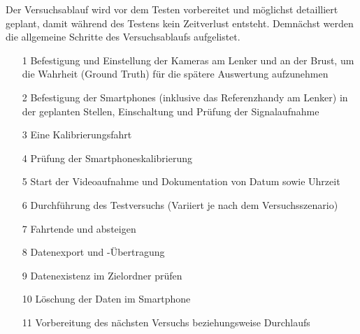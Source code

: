 Der Versuchsablauf wird vor dem Testen vorbereitet und möglichst detailliert geplant, damit während des Testens kein Zeitverlust entsteht.
Demnächst werden die allgemeine Schritte des Versuchsablaufs aufgelistet.

\begin{itemize}
	\item[1] Befestigung und Einstellung der Kameras am Lenker und an der Brust, um die Wahrheit (Ground Truth) für die spätere Auswertung aufzunehmen
	\item[2] Befestigung der Smartphones (inklusive das Referenzhandy am Lenker) in der geplanten Stellen, Einschaltung und Prüfung der Signalaufnahme
	\item[3] Eine Kalibrierungsfahrt
	\item[4] Prüfung der Smartphoneskalibrierung
	\item[5] Start der Videoaufnahme und Dokumentation von Datum sowie Uhrzeit
	\item[6] Durchführung des Testversuchs (Variiert je nach dem Versuchsszenario)
	\item[7] Fahrtende und absteigen
	\item[8] Datenexport und -Übertragung
	\item[9] Datenexistenz im Zielordner prüfen
	\item[10] Löschung der Daten im Smartphone
	\item[11] Vorbereitung des nächsten Versuchs beziehungsweise Durchlaufs
\end{itemize}

